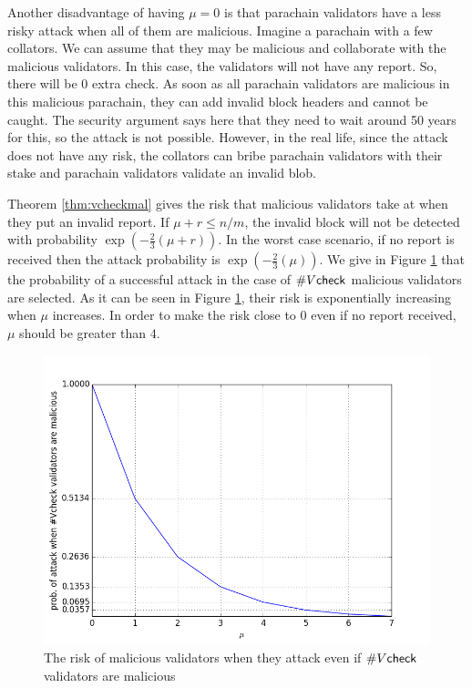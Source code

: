 Another disadvantage of having $\mu = 0$ is that parachain validators have a less risky attack  when all of them are malicious. Imagine a parachain with a few collators. We can assume that they may be malicious and collaborate with the malicious validators. In this case, the validators will not have any report. So, there will be 0 extra check. As soon as all parachain validators are malicious in this malicious parachain, they can add invalid block headers and cannot be caught. The security argument says here that they need to wait around 50 years for this, so the attack is not possible. However, in the real life, since the attack does not have any risk, the collators can bribe parachain validators with their stake and parachain validators validate an invalid blob.


Theorem \ref{thm:vcheckmal} gives the risk that  malicious validators take at  when they put an invalid report.  If $\mu + r \leq n/m$, the invalid block will not be detected with probability $\exp(-\frac{2}{3}(\mu+r))$. In the worst case scenario, if no report is received then the attack probability is $\exp(-\frac{2}{3}(\mu))$. We give in Figure \ref{fig:mu} that the probability of a successful attack in the case of $\#V\mathsf{check}$ malicious validators are selected. As it can be seen in Figure \ref{fig:mu}, their risk is exponentially increasing when $\mu$ increases. In order to make the risk close to 0 even if no report received, $\mu$ should be greater than $4$.

\begin{figure}[h]\centering
	  \includegraphics[width=12cm]{images/muval.png}
	  \caption{The risk of malicious validators when they attack even if $\#V\mathsf{check}$ validators are malicious}
	  \label{fig:mu}
\end{figure}


